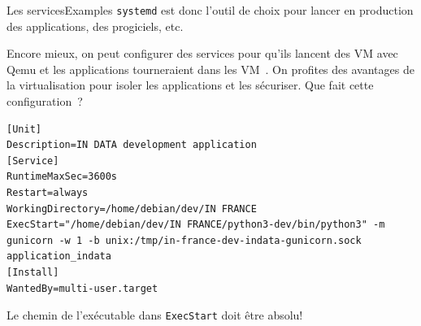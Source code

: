 \documentclass{beamer}
\begin{document}
    \begin{frame}[fragile]{Les services}{Examples}
        \lstinline{systemd} est donc l'outil de choix pour lancer en production des applications, des progiciels, etc.

        Encore mieux, on peut configurer des services pour qu'ils lancent des VM avec Qemu et les applications tourneraient dans les VM~.
        On profites des avantages de la virtualisation pour isoler les applications et les sécuriser.
        \bigbreak
        Que fait cette configuration~?
        \begin{lstlisting}
[Unit]
Description=IN DATA development application
[Service]
RuntimeMaxSec=3600s
Restart=always
WorkingDirectory=/home/debian/dev/IN FRANCE
ExecStart="/home/debian/dev/IN FRANCE/python3-dev/bin/python3" -m gunicorn -w 1 -b unix:/tmp/in-france-dev-indata-gunicorn.sock application_indata
[Install]
WantedBy=multi-user.target
        \end{lstlisting}
        \begin{dangercolorbox}
            Le chemin de l'exécutable dans \lstinline{ExecStart} doit être absolu!
        \end{dangercolorbox}
    \end{frame}
\end{document}
